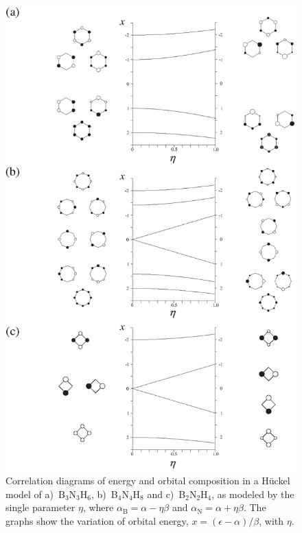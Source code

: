 \begin{figure}[htp]
\begin{center}
\includegraphics[scale=0.95]{huckel/figures/fig2.eps}
\end{center}
\caption{Correlation diagrams of energy and orbital composition in a H\"uckel model of \mbox{a) B$_3$N$_3$H$_6$,} 
\mbox{b) B$_4$N$_4$H$_8$} and \mbox{c) B$_2$N$_2$H$_4$,} as modeled by the single parameter $\eta$, where
$\alpha_\mathrm{B}=\alpha-\eta\beta$ and $\alpha_\mathrm{N}=\alpha+\eta\beta$. The graphs show the
variation of orbital energy, $x=(\epsilon-\alpha)/\beta$, with $\eta$.}
\label{ch5.fig.f02}
\end{figure}

